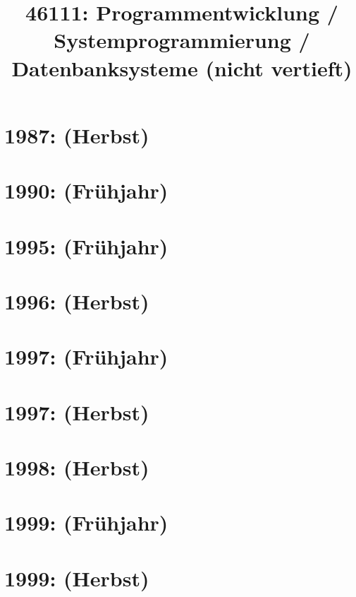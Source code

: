 \documentclass{lehramt-informatik-haupt}
\title{46111: Programmentwicklung / Systemprogrammierung / Datenbanksysteme (nicht vertieft)}
\begin{document}
\maketitle
\tableofcontents

\section{1987: (Herbst)}


\section{1990: (Frühjahr)}


\section{1995: (Frühjahr)}


\section{1996: (Herbst)}


\section{1997: (Frühjahr)}


\section{1997: (Herbst)}


\section{1998: (Herbst)}


\section{1999: (Frühjahr)}


\section{1999: (Herbst)}

\end{document}
